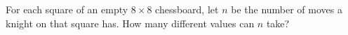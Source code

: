 For each square of an empty $8\times8$ chessboard, let $n$ be the number of moves a knight on that square has. How many different values can $n$ take?
